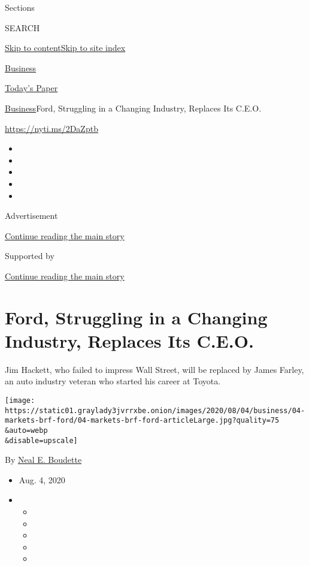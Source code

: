 Sections

SEARCH

\protect\hyperlink{site-content}{Skip to
content}\protect\hyperlink{site-index}{Skip to site index}

\href{https://www.nytimes3xbfgragh.onion/section/business}{Business}

\href{https://myaccount.nytimes3xbfgragh.onion/auth/login?response_type=cookie\&client_id=vi}{}

\href{https://www.nytimes3xbfgragh.onion/section/todayspaper}{Today's
Paper}

\href{/section/business}{Business}\textbar{}Ford, Struggling in a
Changing Industry, Replaces Its C.E.O.

\url{https://nyti.ms/2DaZptb}

\begin{itemize}
\item
\item
\item
\item
\item
\end{itemize}

Advertisement

\protect\hyperlink{after-top}{Continue reading the main story}

Supported by

\protect\hyperlink{after-sponsor}{Continue reading the main story}

\hypertarget{ford-struggling-in-a-changing-industry-replaces-its-ceo}{%
\section{Ford, Struggling in a Changing Industry, Replaces Its
C.E.O.}\label{ford-struggling-in-a-changing-industry-replaces-its-ceo}}

Jim Hackett, who failed to impress Wall Street, will be replaced by
James Farley, an auto industry veteran who started his career at Toyota.

\texttt{[image: https://static01.graylady3jvrrxbe.onion/images/2020/08/04/business/04-markets-brf-ford/04-markets-brf-ford-articleLarge.jpg?quality=75\\\&auto=webp\\\&disable=upscale]}

By \href{https://www.nytimes3xbfgragh.onion/by/neal-e-boudette}{Neal E.
Boudette}

\begin{itemize}
\item
  Aug. 4, 2020
\item
  \begin{itemize}
  \item
  \item
  \item
  \item
  \item
  \end{itemize}
\end{itemize}

